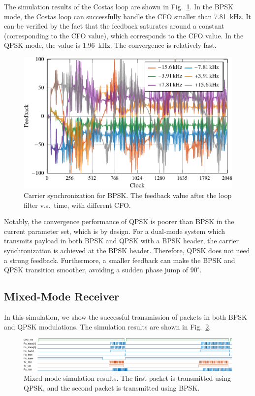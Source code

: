 \documentclass[journal,twoside]{IEEEtran}
\begin{document}
      The simulation results of the Costas loop are shown in Fig.~\ref{fig:sync_BPSK}.
      In the BPSK mode, the Costas loop can successfully handle the CFO smaller than \qty{7.81}{kHz}.
      It can be verified by the fact that the feedback saturates around a constant (corresponding to the CFO value),
      which corresponds to the CFO value.
      In the QPSK mode, the value is \qty{1.96}{kHz}.
      The convergence is relatively fast.
      \begin{figure}[htbp]
        \centering
        \includegraphics{_tikz_sim_sync_BPSK-crop.pdf}
        \caption{Carrier synchronization for BPSK. The feedback value after the loop filter v.s.\ time, with different CFO.}
        \label{fig:sync_BPSK}
      \end{figure}
      
      Notably, the convergence performance of QPSK is poorer than BPSK in the current parameter set,
      which is by design.
      For a dual-mode system which transmits payload in both BPSK and QPSK with a BPSK header,
      the carrier synchronization is achieved at the BPSK header.
      Therefore, QPSK does not need a strong feedback.
      Furthermore, a smaller feedback can make the BPSK and QPSK transition smoother,
      avoiding a sudden phase jump of $90^\circ$.

    \subsection{Mixed-Mode Receiver}

      In this simulation, we show the successful transmission of packets in both BPSK and QPSK modulations.
      The simulation results are shown in Fig.~\ref{fig:mix_sim}.
      \begin{figure}
        \includegraphics{_tikz_sim_MIX-crop.pdf}
        \caption{Mixed-mode simulation results.
          The first packet is transmitted using QPSK, and the second packet is transmitted using BPSK.}
        \label{fig:mix_sim}
      \end{figure}
\end{document}
